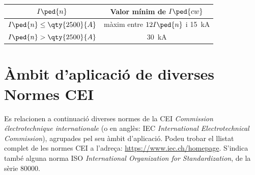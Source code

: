 \begin{list}{}
	\begin{center}
		 \label{taula:InIcw}
		\begin{tabular}{cc}
			\toprule[1pt]
			$I\ped{n}$ &  Valor mínim de $I\ped{cw}$ \\
			\midrule
			$I\ped{n} \leq \qty{2500}{A}$  & màxim entre $12  I\ped{n}$ i \qty{15}{kA}  \\
			$I\ped{n} > \qty{2500}{A}$  & \qty{30}{kA}   \\
			\bottomrule[1pt]
		\end{tabular}
	\end{center}
\end{list}


\section{Àmbit d'aplicació de diverses Normes CEI}\label{sec:normes_IEC}

Es relacionen a continuació diverses normes de la CEI \textit{Commission électrotechnique internationale} (o en anglès: IEC \textit{International Electrotechnical Commission}), agrupades pel seu àmbit d'aplicació. Podeu trobar el llistat complet de les normes CEI a l'adreça: \href{https://www.iec.ch/homepage}{https:/\!\!/www.iec.ch/homepage}. S'indica també alguna norma ISO \textit{International Organization for Standardization}, de la sèrie 80000.

